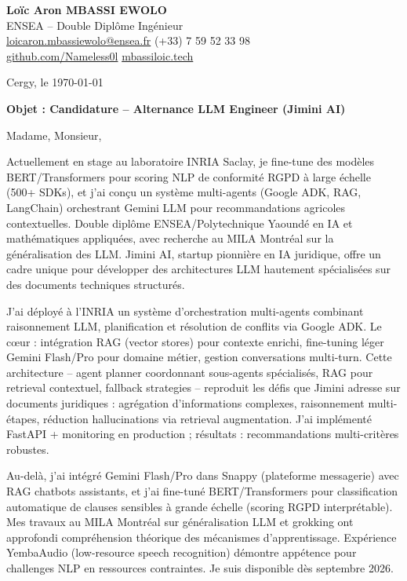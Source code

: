 \documentclass[a4paper,11pt]{article}
\begin{document}
\noindent \textbf{Lo\"ic Aron MBASSI EWOLO} \\
ENSEA -- Double Dipl\^ome Ing\'enieur \\
\href{mailto:loicaron.mbassiewolo@ensea.fr}{loicaron.mbassiewolo@ensea.fr} \quad (+33) 7 59 52 33 98 \\
\href{https://github.com/Nameless0l}{github.com/Nameless0l} \quad \href{https://mbassiloic.tech}{mbassiloic.tech}

\vspace{1em}
\noindent Cergy, le \today

\vspace{1em}
\noindent \textbf{Objet : Candidature -- Alternance LLM Engineer (Jimini AI)}

\vspace{1.5em}
\noindent Madame, Monsieur,

\vspace{0.8em}
\noindent Actuellement en stage au laboratoire INRIA Saclay, je fine-tune des modèles BERT/Transformers pour scoring NLP de conformité RGPD à large échelle (500+ SDKs), et j'ai conçu un système multi-agents (Google ADK, RAG, LangChain) orchestrant Gemini LLM pour recommandations agricoles contextuelles. Double diplôme ENSEA/Polytechnique Yaoundé en IA et mathématiques appliquées, avec recherche au MILA Montréal sur la généralisation des LLM. Jimini AI, startup pionnière en IA juridique, offre un cadre unique pour développer des architectures LLM hautement spécialisées sur des documents techniques structurés.

\vspace{0.8em}
\noindent J'ai déployé à l'INRIA un système d'orchestration multi-agents combinant raisonnement LLM, planification et résolution de conflits via Google ADK. Le cœur : intégration RAG (vector stores) pour contexte enrichi, fine-tuning léger Gemini Flash/Pro pour domaine métier, gestion conversations multi-turn. Cette architecture -- agent planner coordonnant sous-agents spécialisés, RAG pour retrieval contextuel, fallback strategies -- reproduit les défis que Jimini adresse sur documents juridiques : agrégation d'informations complexes, raisonnement multi-étapes, réduction hallucinations via retrieval augmentation. J'ai implémenté FastAPI + monitoring en production ; résultats : recommandations multi-critères robustes.

\vspace{0.8em}
\noindent Au-delà, j'ai intégré Gemini Flash/Pro dans Snappy (plateforme messagerie) avec RAG chatbots assistants, et j'ai fine-tuné BERT/Transformers pour classification automatique de clauses sensibles à grande échelle (scoring RGPD interprétable). Mes travaux au MILA Montréal sur généralisation LLM et grokking ont approfondi compréhension théorique des mécanismes d'apprentissage. Expérience YembaAudio (low-resource speech recognition) démontre appétence pour challenges NLP en ressources contraintes. Je suis disponible dès septembre 2026.
\end{document}
